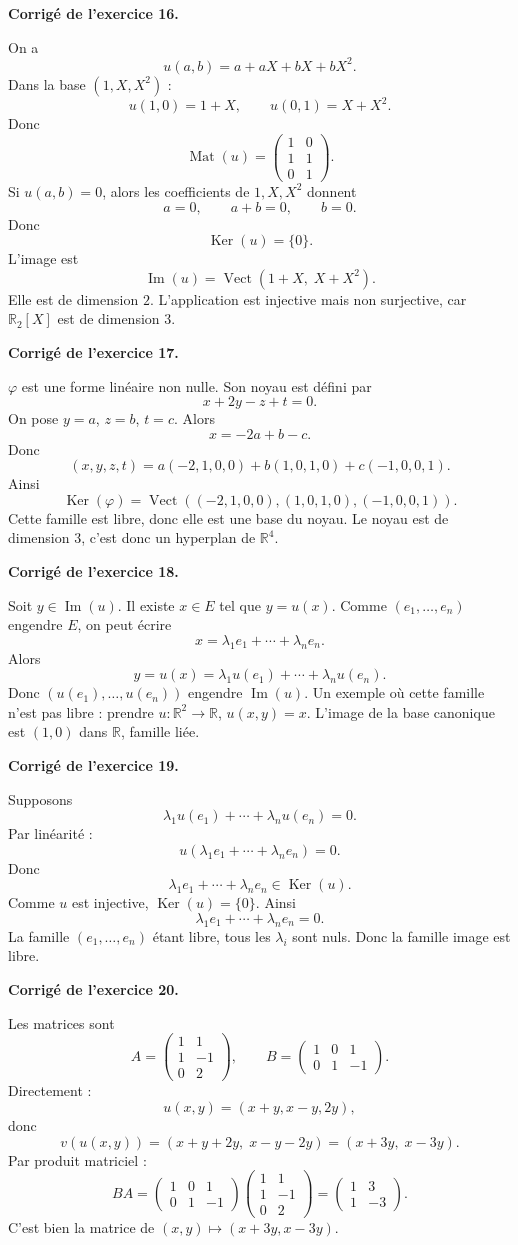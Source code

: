 \documentclass[11pt,a4paper]{article}
\newcommand{\corr}[1]{
    \vspace{0.4cm}
    \noindent\textbf{\textcolor{bleuprepa}{Corrigé de l'exercice #1.}}
    \par\vspace{0.1cm}
}
\newcommand{\R}{\mathbb{R}}
\newcommand{\Ker}{\operatorname{Ker}}
\newcommand{\Img}{\operatorname{Im}}
\newcommand{\Mat}{\operatorname{Mat}}
\newcommand{\Vect}{\operatorname{Vect}}
\begin{document}
\corr{16}
On a
\[
u(a,b)=a+aX+bX+bX^2.
\]
Dans la base $(1,X,X^2)$ :
\[
u(1,0)=1+X,\qquad u(0,1)=X+X^2.
\]
Donc
\[
\Mat(u)=
\begin{pmatrix}
1&0\\
1&1\\
0&1
\end{pmatrix}.
\]
Si $u(a,b)=0$, alors les coefficients de $1,X,X^2$ donnent
\[
a=0,\qquad a+b=0,\qquad b=0.
\]
Donc
\[
\Ker(u)=\{0\}.
\]
L'image est
\[
\Img(u)=\Vect(1+X,\;X+X^2).
\]
Elle est de dimension $2$. L'application est injective mais non surjective, car $\R_2[X]$ est de dimension $3$.

\corr{17}
$\varphi$ est une forme linéaire non nulle. Son noyau est défini par
\[
x+2y-z+t=0.
\]
On pose $y=a$, $z=b$, $t=c$. Alors
\[
x=-2a+b-c.
\]
Donc
\[
(x,y,z,t)=a(-2,1,0,0)+b(1,0,1,0)+c(-1,0,0,1).
\]
Ainsi
\[
\Ker(\varphi)=\Vect((-2,1,0,0),(1,0,1,0),(-1,0,0,1)).
\]
Cette famille est libre, donc elle est une base du noyau. Le noyau est de dimension $3$, c'est donc un hyperplan de $\R^4$.

\corr{18}
Soit $y\in\Img(u)$. Il existe $x\in E$ tel que $y=u(x)$. Comme $(e_1,\dots,e_n)$ engendre $E$, on peut écrire
\[
x=\lambda_1e_1+\cdots+\lambda_ne_n.
\]
Alors
\[
y=u(x)=\lambda_1u(e_1)+\cdots+\lambda_nu(e_n).
\]
Donc $(u(e_1),\dots,u(e_n))$ engendre $\Img(u)$. Un exemple où cette famille n'est pas libre : prendre $u:\R^2\to\R$, $u(x,y)=x$. L'image de la base canonique est $(1,0)$ dans $\R$, famille liée.

\corr{19}
Supposons
\[
\lambda_1u(e_1)+\cdots+\lambda_nu(e_n)=0.
\]
Par linéarité :
\[
u(\lambda_1e_1+\cdots+\lambda_ne_n)=0.
\]
Donc
\[
\lambda_1e_1+\cdots+\lambda_ne_n\in\Ker(u).
\]
Comme $u$ est injective, $\Ker(u)=\{0\}$. Ainsi
\[
\lambda_1e_1+\cdots+\lambda_ne_n=0.
\]
La famille $(e_1,\dots,e_n)$ étant libre, tous les $\lambda_i$ sont nuls. Donc la famille image est libre.

\corr{20}
Les matrices sont
\[
A=
\begin{pmatrix}
1&1\\
1&-1\\
0&2
\end{pmatrix},
\qquad
B=
\begin{pmatrix}
1&0&1\\
0&1&-1
\end{pmatrix}.
\]
Directement :
\[
u(x,y)=(x+y,x-y,2y),
\]
donc
\[
v(u(x,y))=(x+y+2y,\;x-y-2y)=(x+3y,\;x-3y).
\]
Par produit matriciel :
\[
BA=
\begin{pmatrix}
1&0&1\\
0&1&-1
\end{pmatrix}
\begin{pmatrix}
1&1\\
1&-1\\
0&2
\end{pmatrix}
=
\begin{pmatrix}
1&3\\
1&-3
\end{pmatrix}.
\]
C'est bien la matrice de $(x,y)\mapsto(x+3y,x-3y)$.
\end{document}
